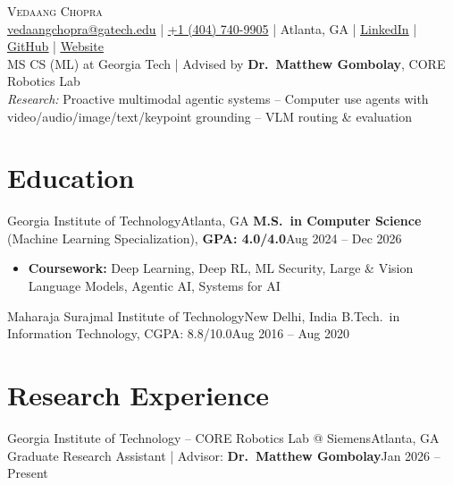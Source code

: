 \documentclass[letterpaper,11pt]{article}
\begin{document}
\begin{center}
  {\Huge \scshape Vedaang Chopra} \\ \vspace{2pt}
  \small
  \href{mailto:vedaangchopra@gatech.edu}{\underline{vedaangchopra@gatech.edu}} \;|\;
  \underline{+1 (404) 740-9905} \;|\;
  Atlanta, GA \;|\;
  \href{https://linkedin.com/in/vedaang-chopra}{\underline{LinkedIn}} \;|\;
  \href{https://github.com/Vedaang-Chopra}{\underline{GitHub}} \;|\;
  \href{https://vedaangchopra.live/}{\underline{Website}}
  \\ \vspace{3pt}
  \small
  MS CS (ML) at Georgia Tech \;|\; Advised by \textbf{Dr.\ Matthew Gombolay}, CORE Robotics Lab \\
  \textit{Research:} Proactive multimodal agentic systems -- Computer use agents with video/audio/image/text/keypoint grounding -- VLM routing \& evaluation
\end{center}
\vspace{-6pt}

\section{Education}
\resumeSubHeadingListStart
\resumeSubheading
{Georgia Institute of Technology}{Atlanta, GA}
{\textbf{M.S.\ in Computer Science} (Machine Learning Specialization), \textbf{GPA: 4.0/4.0}}{Aug 2024 -- Dec 2026}
\vspace{-3pt}
\begin{itemize}[leftmargin=0.20in, topsep=0pt, itemsep=0pt]
  \item\footnotesize{\textbf{Coursework:} Deep Learning, Deep RL, ML Security, Large \& Vision Language Models, Agentic AI, Systems for AI}
\end{itemize}
\vspace{-6pt}
\resumeEducationCompact
{Maharaja Surajmal Institute of Technology}{New Delhi, India}
{B.Tech.\ in Information Technology, CGPA: 8.8/10.0}{Aug 2016 -- Aug 2020}
\resumeSubHeadingListEnd

\section{Research Experience}
\resumeSubHeadingListStart
\resumeSubheading
{Georgia Institute of Technology -- CORE Robotics Lab @ Siemens}{Atlanta, GA}
{Graduate Research Assistant \;|\; Advisor: \textbf{Dr.\ Matthew Gombolay}}{Jan 2026 -- Present}
\resumeItemListStart
\end{document}
